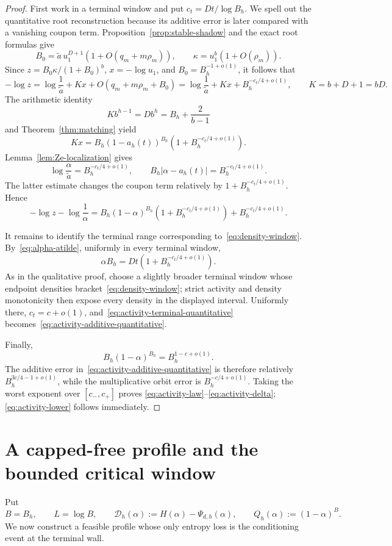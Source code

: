 \documentclass[11pt]{amsart}
\theoremstyle{definition}
\newcommand{\Dcal}{\mathcal D}
\begin{document}
\begin{proof}
First work in a terminal window and put $c_t=Dt/\log B_h$.  We spell out the quantitative root reconstruction because its additive error is later compared with a vanishing coupon term.  Proposition~\ref{prop:stable-shadow} and the exact root formulas give
\[
 B_0=\widetilde a\,u_1^{D+1}
 \left(1+O(q_m+m\rho_m)\right),
 \qquad
 \kappa=u_1^b\left(1+O(\rho_m)\right).
\]
Since $z=B_0\kappa/(1+B_0)^b$, $x=-\log u_1$, and
$B_0=B_h^{-1+o(1)}$, it follows that
\[
 -\log z
 =\log\frac1{\widetilde a}+Kx
 +O(q_m+m\rho_m+B_0)
 =\log\frac1{\widetilde a}+Kx
 +B_h^{-c_t/4+o(1)},
 \qquad K=b+D+1=bD.
\]
The arithmetic identity
\[
 Kb^{h-1}=Db^h=B_h+\frac2{b-1}
\]
and Theorem~\ref{thm:matching} yield
\[
 Kx
 =B_h(1-a_h(t))^{B_h}
 \left(1+B_h^{-c_t/4+o(1)}\right).
\]
Lemma~\ref{lem:Ze-localization} gives
\[
 \log\frac{\alpha}{\widetilde a}=B_h^{-c_t/4+o(1)},
 \qquad
 B_h|\alpha-a_h(t)|=B_h^{-c_t/4+o(1)}.
\]
The latter estimate changes the coupon term relatively by
$1+B_h^{-c_t/4+o(1)}$.  Hence
\begin{equation}\label{eq:activity-terminal-quantitative}
 -\log z-\log\frac1\alpha
 =B_h(1-\alpha)^{B_h}
  \left(1+B_h^{-c_t/4+o(1)}\right)
  +B_h^{-c_t/4+o(1)}.
\end{equation}

It remains to identify the terminal range corresponding to~\eqref{eq:density-window}.  By~\eqref{eq:alpha-atilde}, uniformly in every terminal window,
\[
 \alpha B_h=Dt\left(1+B_h^{-c_t/4+o(1)}\right).
\]
As in the qualitative proof, choose a slightly broader terminal window whose endpoint densities bracket~\eqref{eq:density-window}; strict activity and density monotonicity then expose every density in the displayed interval.  Uniformly there, $c_t=c+o(1)$, and~\eqref{eq:activity-terminal-quantitative} becomes~\eqref{eq:activity-additive-quantitative}.

Finally,
\[
 B_h(1-\alpha)^{B_h}=B_h^{1-c+o(1)}.
\]
The additive error in~\eqref{eq:activity-additive-quantitative} is therefore relatively
$B_h^{3c/4-1+o(1)}$, while the multiplicative orbit error is
$B_h^{-c/4+o(1)}$.  Taking the worst exponent over $[c_-,c_+]$ proves
\eqref{eq:activity-law}--\eqref{eq:activity-delta};
\eqref{eq:activity-lower} follows immediately.
\end{proof}


\section{A capped-free profile and the bounded critical window}\label{sec:bounded-window}
Put
\[
 B=B_h,\qquad L=\log B,
 \qquad
 \Dcal_h(\alpha):=H(\alpha)-\Psi_{d,h}(\alpha),
 \qquad
 Q_h(\alpha):=(1-\alpha)^B.
\]
We now construct a feasible profile whose only entropy loss is the conditioning event at the terminal wall.
\end{document}
